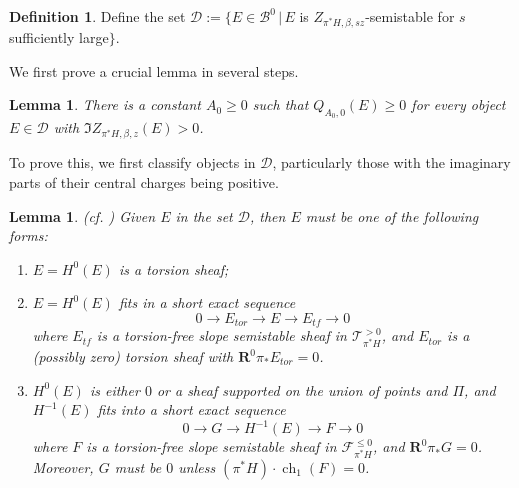 \documentclass[12pt]{amsart}
\newtheorem{lemma}[theorem]{Lemma}
\theoremstyle{definition}
\newtheorem{definition}[theorem]{Definition}
\DeclareMathOperator{\ch}{ch}
\begin{document}
\begin{definition}
Define the set $\mathcal{D}:=\{E \in \mathcal{B}^0 \, | \, E $ is $Z_{\pi^\ast H,\beta,sz}$-semistable for $s$ sufficiently large$\}$.  
\end{definition}

We first prove a crucial lemma in several steps.
\begin{lemma}\label{mathcalD}
There is a constant $A_0\geq 0$ such that $Q_{A_0,0}(E) \geq 0$ for every object $E \in \mathcal{D}$ with $\Im Z_{\pi^\ast H,\beta,z}(E)>0$.
\end{lemma}

To prove this, we first classify objects in $\mathcal{D}$,
particularly those with the imaginary parts of their central charges being positive.

\begin{lemma}\label{6.5'}\textnormal{(cf. \cite[Lemma 6.4]{TX22})}
Given $E$ in the set $\mathcal{D}$, then $E$ must be one of the following forms:
\begin{enumerate}
    \item[(1)] $E=H^0(E)$ is a torsion sheaf;
    \item[(2)] $E=H^0(E)$ fits in a short exact sequence $$ 0 \longrightarrow E_{tor} \longrightarrow E \longrightarrow E_{tf} \longrightarrow 0$$
    where $E_{tf}$ is a torsion-free slope semistable sheaf in $\mathcal{T}^{> 0}_{\pi^\ast H}$, and $E_{tor}$ is a (possibly zero) torsion sheaf with $\mathbf{R}^0 \pi_\ast E_{tor}= 0$.  
    \item[(3)] $H^0(E)$ is either $0$ or a sheaf supported on the union of points and $\Pi$, and $H^{-1}(E)$ fits into a short exact sequence
    $$ 0 \longrightarrow G \longrightarrow H^{-1}(E) \longrightarrow F \longrightarrow 0$$
    where $F$ is a torsion-free slope semistable sheaf in $\mathcal{F}^{\leq 0}_{\pi^\ast H}$, and $\mathbf{R}^0 \pi_\ast G = 0$.
    Moreover, $G$ must be $0$ unless $(\pi^\ast H)\cdot \ch_1(F) =0$.
\end{enumerate}
\end{lemma}
\end{document}
